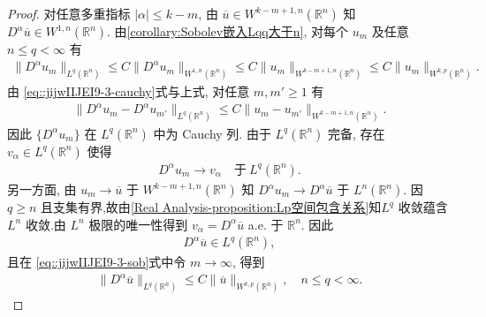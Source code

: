 \documentclass[../../main.tex]{subfiles}
\begin{document}
\begin{proof}
对任意多重指标 $|\alpha|\leqslant k-m$, 由 $\overline{u}\in W^{k-m+1,n}(\mathbb{R}^{n})$ 知 $D^{\alpha}\overline{u}\in W^{1,n}(\mathbb{R}^{n})$. 由\cref{corollary:Sobolev嵌入Lqq大于n}, 对每个 $u_{m}$ 及任意 $n\leqslant q<\infty$ 有
\begin{align}\label{eq::jijwIIJEI9-3-sob}
\|D^{\alpha}u_{m}\|_{L^{q}(\mathbb{R}^{n})}\leqslant C\|D^{\alpha}u_{m}\|_{W^{1,n}(\mathbb{R}^{n})}\leqslant C\|u_{m}\|_{W^{k-m+1,n}(\mathbb{R}^{n})}\leqslant C\|u_{m}\|_{W^{k,p}(\mathbb{R}^{n})}.
\end{align}
由 \eqref{eq::jijwIIJEI9-3-cauchy}式与上式, 对任意 $m,m'\geqslant1$ 有
\begin{align*}
\|D^{\alpha}u_{m}-D^{\alpha}u_{m'}\|_{L^{q}(\mathbb{R}^{n})}\leqslant C\|u_{m}-u_{m'}\|_{W^{k-m+1,n}(\mathbb{R}^{n})}.
\end{align*}
因此 $\{D^{\alpha}u_{m}\}$ 在 $L^{q}(\mathbb{R}^{n})$ 中为 Cauchy 列. 由于 $L^{q}(\mathbb{R}^{n})$ 完备, 存在 $v_{\alpha}\in L^{q}(\mathbb{R}^{n})$ 使得
\begin{align*}
D^{\alpha}u_{m}\to v_{\alpha}\quad\text{于}\ L^{q}(\mathbb{R}^{n}).
\end{align*}
另一方面, 由 $u_{m}\to\overline{u}$ 于 $W^{k-m+1,n}(\mathbb{R}^{n})$ 知 $D^{\alpha}u_{m}\to D^{\alpha}\overline{u}$ 于 $L^{n}(\mathbb{R}^{n})$. 因 $q\geqslant n$ 且支集有界,故由\cref{Real Analysis-proposition:Lp空间包含关系}知$L^{q}$ 收敛蕴含 $L^{n}$ 收敛.由 $L^{n}$ 极限的唯一性得到 $v_{\alpha}=D^{\alpha}\overline{u}$ a.e. 于 $\mathbb{R}^{n}$. 因此
\begin{align*}
D^{\alpha}\overline{u}\in L^{q}(\mathbb{R}^{n}),
\end{align*}
且在 \eqref{eq::jijwIIJEI9-3-sob}式中令 $m\to\infty$, 得到
\begin{align}\label{eq::jijwIIJEI9-3-Lq}
\|D^{\alpha}\overline{u}\|_{L^{q}(\mathbb{R}^{n})}\leqslant C\|\overline{u}\|_{W^{k,p}(\mathbb{R}^{n})},\quad n\leqslant q<\infty.
\end{align}


\end{proof}
\end{document}
